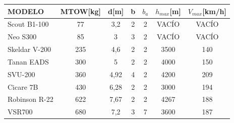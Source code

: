 \begin{table}[htbp]
	\centering
	\begin{tabular}{|l|c|c|c|c|c|c|}
		\hline
		\rowcolor[rgb]{ .851,  .851,  .851} MODELO & \multicolumn{1}{l|}{MTOW[kg]} & \multicolumn{1}{l|}{d[m]} & \multicolumn{1}{l|}{b} & \multicolumn{1}{l|}{$b_a$} & \multicolumn{1}{l|}{$h_{max}$[m]} & \multicolumn{1}{l|}{$V_{max}$[km/h]} \\
		\hline
		\rowcolor[rgb]{ .949,  .949,  .949} Scout B1-100 & \cellcolor[rgb]{ 1,  1,  1}77 & \cellcolor[rgb]{ 1,  1,  1}3,2 & \cellcolor[rgb]{ 1,  1,  1}2 & \cellcolor[rgb]{ 1,  1,  1}2 & \cellcolor[rgb]{ 1,  1,  1}VACÍO & \cellcolor[rgb]{ 1,  1,  1}VACÍO \\
		\hline
		\rowcolor[rgb]{ .949,  .949,  .949} Neo S300 & \cellcolor[rgb]{ 1,  1,  1}85 & \cellcolor[rgb]{ 1,  1,  1}3 & \cellcolor[rgb]{ 1,  1,  1}3 & \cellcolor[rgb]{ 1,  1,  1}2 & \cellcolor[rgb]{ 1,  1,  1}VACÍO & \cellcolor[rgb]{ 1,  1,  1}VACÍO \\
		\hline
		\rowcolor[rgb]{ .949,  .949,  .949} Skeldar V-200 & \cellcolor[rgb]{ 1,  1,  1}235 & \cellcolor[rgb]{ 1,  1,  1}4,6 & \cellcolor[rgb]{ 1,  1,  1}2 & \cellcolor[rgb]{ 1,  1,  1}2 & \cellcolor[rgb]{ 1,  1,  1}3500 & \cellcolor[rgb]{ 1,  1,  1}140 \\
		\hline
		\rowcolor[rgb]{ .949,  .949,  .949} Tanan EADS & \cellcolor[rgb]{ 1,  1,  1}300 & \cellcolor[rgb]{ 1,  1,  1}5 & \cellcolor[rgb]{ 1,  1,  1}2 & \cellcolor[rgb]{ 1,  1,  1}2 & \cellcolor[rgb]{ 1,  1,  1}4000 & \cellcolor[rgb]{ 1,  1,  1}150 \\
		\hline
		\rowcolor[rgb]{ .949,  .949,  .949} SVU-200 & \cellcolor[rgb]{ 1,  1,  1}360 & \cellcolor[rgb]{ 1,  1,  1}4,92 & \cellcolor[rgb]{ 1,  1,  1}4 & \cellcolor[rgb]{ 1,  1,  1}2 & \cellcolor[rgb]{ 1,  1,  1}4200 & \cellcolor[rgb]{ 1,  1,  1}209 \\
		\hline
		\rowcolor[rgb]{ .949,  .949,  .949} Cicare 7B & \cellcolor[rgb]{ 1,  1,  1}430 & \cellcolor[rgb]{ 1,  1,  1}6,28 & \cellcolor[rgb]{ 1,  1,  1}2 & \cellcolor[rgb]{ 1,  1,  1}2 & \cellcolor[rgb]{ 1,  1,  1}3000 & \cellcolor[rgb]{ 1,  1,  1}194 \\
		\hline
		\rowcolor[rgb]{ .949,  .949,  .949} Robinson R-22 & \cellcolor[rgb]{ 1,  1,  1}622 & \cellcolor[rgb]{ 1,  1,  1}7,67 & \cellcolor[rgb]{ 1,  1,  1}2 & \cellcolor[rgb]{ 1,  1,  1}2 & \cellcolor[rgb]{ 1,  1,  1}4267 & \cellcolor[rgb]{ 1,  1,  1}188 \\
		\hline
		\rowcolor[rgb]{ .949,  .949,  .949} VSR700 & \cellcolor[rgb]{ 1,  1,  1}680 & \cellcolor[rgb]{ 1,  1,  1}7,2 & \cellcolor[rgb]{ 1,  1,  1}3 & \cellcolor[rgb]{ 1,  1,  1}7 & \cellcolor[rgb]{ 1,  1,  1}3600 & \cellcolor[rgb]{ 1,  1,  1}187 \\

\end{tabular}
\end{table}
